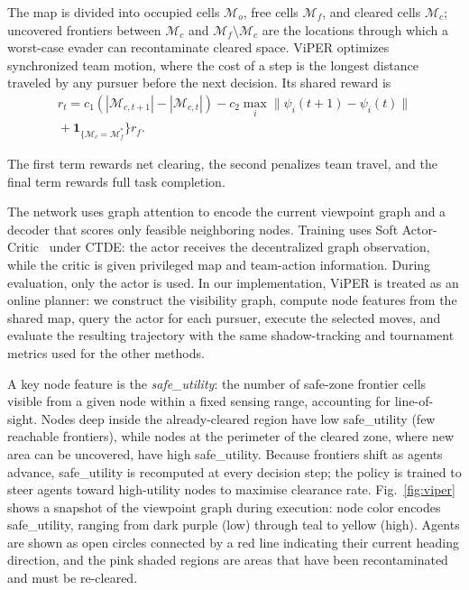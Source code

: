 \documentclass[conference]{IEEEtran}
\begin{document}
The map is divided into occupied cells $\mathcal{M}_o$, free cells $\mathcal{M}_f$, and cleared cells $\mathcal{M}_c$; uncovered frontiers between $\mathcal{M}_c$ and $\mathcal{M}_f\setminus\mathcal{M}_c$ are the locations through which a worst-case evader can recontaminate cleared space.
ViPER optimizes synchronized team motion, where the cost of a step is the longest distance traveled by any pursuer before the next decision.
Its shared reward is
\begin{equation}
\label{eq:shared-reward}
\begin{aligned}
r_t =
c_1\left(|\mathcal{M}_{c,t+1}|-|\mathcal{M}_{c,t}|\right)
-c_2 \max_i \|\psi_i(t+1)-\psi_i(t)\|\\
{}+
\mathbf{1}_{\{\mathcal{M}_c=\mathcal{M}_f^*}\}r_f .
\end{aligned}
\end{equation}

The first term rewards net clearing, the second penalizes team travel, and the final term rewards full task completion.

The network uses graph attention to encode the current viewpoint graph and a decoder that scores only feasible neighboring nodes.
Training uses Soft Actor-Critic~\cite{haarnoja2018soft} under CTDE: the actor receives the decentralized graph observation, while the critic is given privileged map and team-action information.
During evaluation, only the actor is used.
In our implementation, ViPER is treated as an online planner: we construct the visibility graph, compute node features from the shared map, query the actor for each pursuer, execute the selected moves, and evaluate the resulting trajectory with the same shadow-tracking and tournament metrics used for the other methods.

A key node feature is the \emph{safe\_utility}: the number of safe-zone frontier cells visible from a given node within a fixed sensing range, accounting for line-of-sight.
Nodes deep inside the already-cleared region have low safe\_utility (few reachable frontiers), while nodes at the perimeter of the cleared zone, where new area can be uncovered, have high safe\_utility.
Because frontiers shift as agents advance, safe\_utility is recomputed at every decision step; the policy is trained to steer agents toward high-utility nodes to maximise clearance rate.
Fig.~\ref{fig:viper} shows a snapshot of the viewpoint graph during execution: node color encodes safe\_utility, ranging from dark purple (low) through teal to yellow (high).
Agents are shown as open circles connected by a red line indicating their current heading direction, and the pink shaded regions are areas that have been recontaminated and must be re-cleared.
\end{document}
